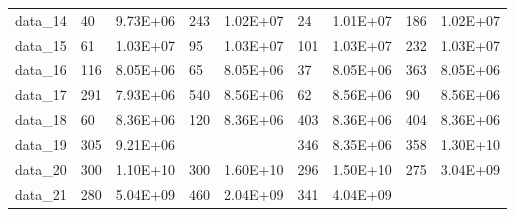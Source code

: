 \begin{table}[]
\begin{tabular}{lllllllll}
data\_14 & 40                                     & 9.73E+06                                   & 243                                      & 1.02E+07                                     & 24                                           & 1.01E+07                                        & 186             & 1.02E+07           \\
data\_15 & 61                                     & 1.03E+07                                   & 95                                       & 1.03E+07                                     & 101                                          & 1.03E+07                                        & 232             & 1.03E+07           \\
data\_16 & 116                                    & 8.05E+06                                   & 65                                       & 8.05E+06                                     & 37                                           & 8.05E+06                                        & 363             & 8.05E+06           \\
data\_17 & 291                                    & 7.93E+06                                   & 540                                      & 8.56E+06                                     & 62                                           & 8.56E+06                                        & 90              & 8.56E+06           \\
data\_18 & 60                                     & 8.36E+06                                   & 120                                      & 8.36E+06                                     & 403                                          & 8.36E+06                                        & 404             & 8.36E+06           \\
data\_19 & 305                                    & 9.21E+06                                   &                                          &                                              & 346                                          & 8.35E+06                                        & 358             & 1.30E+10           \\
data\_20 & 300                                    & 1.10E+10                                   & 300                                      & 1.60E+10                                     & 296                                          & 1.50E+10                                        & 275             & 3.04E+09           \\
data\_21 & 280                                    & 5.04E+09                                   & 460                                      & 2.04E+09                                     & 341                                          & 4.04E+09                                        &                 &                    \\

\end{tabular}
\end{table}
